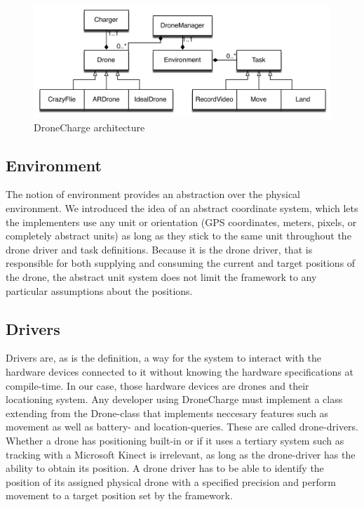 \begin{figure}[h]
\centering
\includegraphics[width=\columnwidth]{images/dronechargearchitecture.png}
\caption{DroneCharge architecture}
\label{fig:architecturefig}
\end{figure}

\subsection{Environment}
The notion of environment provides an abstraction over the physical environment. We introduced the idea of an abstract coordinate system, which lets the implementers use any unit or orientation (GPS coordinates, meters, pixels, or completely abstract units) as long as they stick to the same unit throughout the drone driver and task definitions. Because it is the drone driver, that is responsible for both supplying and consuming the current and target positions of the drone, the abstract unit system does not limit the framework to any particular assumptions about the positions.

\subsection{Drivers}
Drivers are, as is the definition, a way for the system to interact with the hardware devices connected to it without knowing the hardware specifications at compile-time. In our case, those hardware devices are drones and their locationing system. Any developer using DroneCharge must implement a class extending from the Drone-class that implements neccesary features such as movement as well as battery- and location-queries. These are called drone-drivers. Whether a drone has positioning built-in or if it uses a tertiary system such as tracking with a Microsoft Kinect is irrelevant, as long as the drone-driver has the ability to obtain its position. A drone driver has to be able to identify the position of its assigned physical drone with a specified precision and perform movement to a target position set by the framework.

